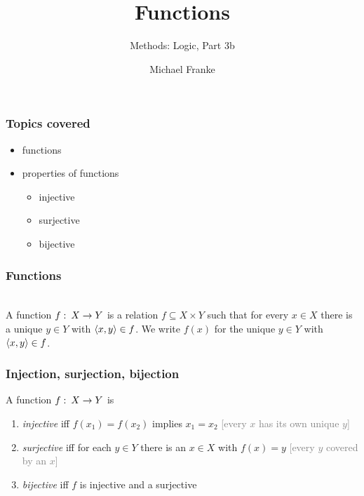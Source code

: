 \documentclass[fleqn,10pt,serif,xcolor=svgnames,xcolor=table,aspectratio=169,handout]{beamer}
\title{Functions}
\subtitle{Methods: Logic, Part 3b}
\author{Michael Franke}
\date{}
\newcommand{\pictureslide}[2][current]{
\usebackgroundtemplate{\texttt{[image: \#2]}}%
\begin{frame}[label=#1]

\end{frame}
}
\newcommand{\mygray}[1]{\textcolor{gray}{#1}}
\begin{document}

\abovedisplayskip=3pt
\abovedisplayshortskip=3pt

\belowdisplayskip=3pt
\belowdisplayshortskip=3pt

\begin{frame}
  \maketitle
\end{frame}

\begin{frame}
  \frametitle{Topics covered}

  \begin{itemize}
    \item functions
    \item properties of functions
    \begin{itemize}
      \item injective
      \item surjective
      \item bijective
    \end{itemize}
  \end{itemize}

\end{frame}

\begin{frame}
  \frametitle{Functions}

  {}\\
  A function $f \thinspace \colon \thinspace X \rightarrow Y$ is a relation $f \subseteq X \times Y$ such that for every $x \in X$ there is a unique $y \in Y$ with $\left \langle x,y\right\rangle \in f$.
  We write $f(x)$ for the unique $y \in Y$ with $\left \langle x,y\right\rangle \in f$.
\end{frame}

{\pictureslide{03b-functions-examples/03b-functions-examples-003.jpeg}}


\begin{frame}
  \frametitle{Injection, surjection, bijection}

  A function $f \thinspace \colon \thinspace X \rightarrow Y$ is
  \begin{enumerate}
    \item[] \textit{injective} iff $f(x_1) = f(x_2)$ implies $x_1 = x_2$
    \hfill \mygray{[every $x$ has its own unique $y$]}
    \item[] \textit{surjective} iff for each $y \in Y$ there is an $x \in X$ with $f(x)=y$
    \hfill \mygray{[every $y$ covered by an $x$]}
    \item[] \textit{bijective} iff $f$ is injective and a surjective
  \end{enumerate}

\end{frame}

{\pictureslide{03b-functions-examples/03b-functions-examples-004.jpeg}}

{\pictureslide{03b-functions-examples/03b-functions-examples-005.jpeg}}

{\pictureslide{03b-functions-examples/03b-functions-examples-006.jpeg}}

{\pictureslide{03b-functions-examples/03b-functions-examples-007.jpeg}}
\end{document}
